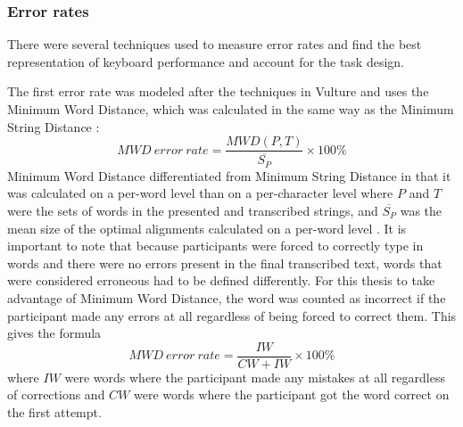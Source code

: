 \subsubsection{Error rates}
There were several techniques used to measure error rates and find the best representation of keyboard performance and account for the task design.

The first error rate was modeled after the techniques in Vulture \cite{ref_vulture} and uses the Minimum Word Distance, which was calculated in the same way as the Minimum String Distance \cite{ref_error_rates,ref_vulture_MSD_ref}:
\begin{equation} \label{MWD}
MWD\ error\ rate = \frac{MWD(P,T)}{\overline{S_P}} \times 100\%
\end{equation}
Minimum Word Distance differentiated from Minimum String Distance in that it was calculated on a per-word level than on a per-character level where $P$ and $T$ were the sets of words in the presented and transcribed strings, and $\overline{S_P}$ was the mean size of the optimal alignments calculated on a per-word level \cite{ref_vulture}. It is important to note that because participants were forced to correctly type in words and there were no errors present in the final transcribed text, words that were considered erroneous had to be defined differently. For this thesis to take advantage of Minimum Word Distance, the word was counted as incorrect if the participant made any errors at all regardless of being forced to correct them. This gives the formula
\begin{equation} \label{MWD_simple}
MWD\ error\ rate = \frac{IW}{CW + IW} \times 100\%
\end{equation}
where $IW$ were words where the participant made any mistakes at all regardless of corrections and $CW$ were words where the participant got the word correct on the first attempt.

